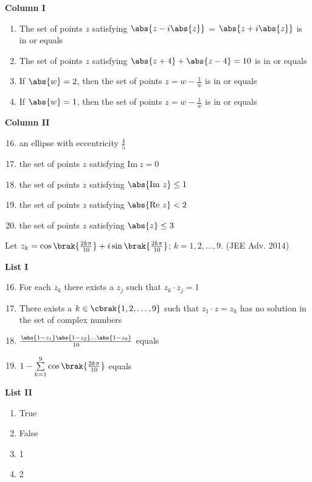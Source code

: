 		\begin{multicols}{2}
			\textbf{Column I}
			\begin{enumerate}[label=(\Alph*)]
				\item The set of points $z$ satisfying $\abs{z - i\abs{z}}$ = $\abs{z + i\abs{z}}$ is in or equals
				\item The set of points $z$ satisfying $\abs{z + 4} + \abs{z - 4} = 10$ is in or equals
				\item If $\abs{w} = 2$, then the set of points $z = w - \frac{1}{w}$ is in or equals
				\item If $\abs{w} = 1$, then the set of points $z = w - \frac{1}{w}$ is in or equals
			\end{enumerate}
		\columnbreak
			\textbf{Column II}
			\begin{enumerate}[label=(\alph*)]
					\setcounter{enumii}{15}
				\item an ellipse with eccentricity $\frac{4}{5}$
				\item the set of points $z$ satisfying $\mathrm{Im}\ z = 0$
				\item the set of points $z$ satisfying $\abs{\mathrm{Im}\ z} \le 1$
				\item the set of points $z$ satisfying $\abs{\mathrm{Re}\ z} < 2$
				\item the set of points $z$ satisfying $\abs{z} \le 3$
			\end{enumerate}
		\end{multicols}

	\item Let $z_k = \cos\brak{\frac{2k\pi}{10}} + i\sin\brak{\frac{2k\pi}{10}}$; $k = 1,2,\dots,9$.
		\hfill (JEE Adv. 2014)

		\begin{multicols}{2}
			\textbf{List I}
			\begin{enumerate}[label=\Alph*.]
					\setcounter{enumii}{15}
				\item For each $z_k$ there exists a $z_j$ such that $z_k \cdot z_j = 1$
				\item There exists a $k \in \cbrak{1,2,\dots, 9}$ such that $z_1 \cdot z = z_k$ has
					no solution in the set of complex numbers
				\item $\frac {\abs{1 - z_1}\abs{1 - z_2}\dots\abs{1-z_9}} {10}$ equals
				\item $1 - \sum\limits_{k=1}^9 \cos\brak{\frac {2k\pi} {10}}$ equals
			\end{enumerate}
		\columnbreak
			\textbf{List II}
			\begin{enumerate}[label=\arabic*.]
				\item True
				\item False
				\item 1
				\item 2
			\end{enumerate}
		\end{multicols}

